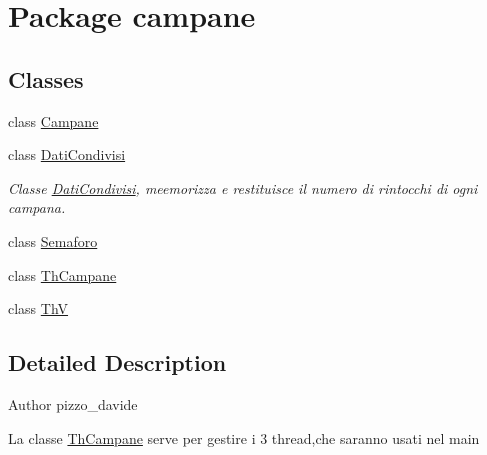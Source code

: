 \hypertarget{namespacecampane}{}\section{Package campane}
\label{namespacecampane}
\subsection*{Classes}
\begin{DoxyCompactItemize}
\item 
class \hyperlink{classcampane_1_1_campane}{Campane}
\item 
class \hyperlink{classcampane_1_1_dati_condivisi}{Dati\+Condivisi}
\begin{DoxyCompactList}\small\item\em Classe \hyperlink{classcampane_1_1_dati_condivisi}{Dati\+Condivisi}, meemorizza e restituisce il numero di rintocchi di ogni campana. \end{DoxyCompactList}\item 
class \hyperlink{classcampane_1_1_semaforo}{Semaforo}
\item 
class \hyperlink{classcampane_1_1_th_campane}{Th\+Campane}
\item 
class \hyperlink{classcampane_1_1_th_v}{ThV}
\end{DoxyCompactItemize}


\subsection{Detailed Description}
\begin{DoxyAuthor}{Author}
pizzo\+\_\+davide
\end{DoxyAuthor}
La classe \textquotesingle{}\hyperlink{classcampane_1_1_th_campane}{Th\+Campane}\textquotesingle{} serve per gestire i 3 thread,che saranno usati nel main 